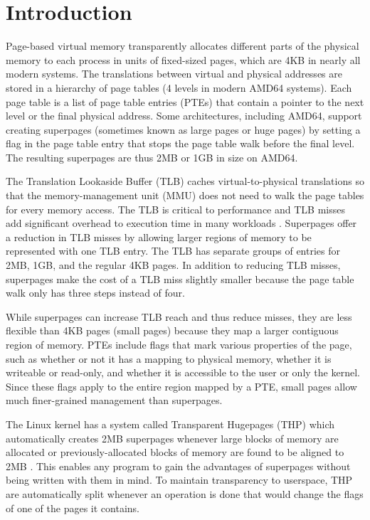 \chapter{Introduction}

Page-based virtual memory transparently allocates different parts of the physical memory to each process in units of fixed-sized pages, which are 4KB in nearly all modern systems. The translations between virtual and physical addresses are stored in a hierarchy of page tables (4 levels in modern AMD64 systems). Each page table is a list of page table entries (PTEs) that contain a pointer to the next level or the final physical address. Some architectures, including AMD64, support creating superpages (sometimes known as large pages or huge pages) by setting a flag in the page table entry that stops the page table walk before the final level. The resulting superpages are thus 2MB or 1GB in size on AMD64.

The Translation Lookaside Buffer (TLB) caches virtual-to-physical translations so that the memory-management unit (MMU) does not need to walk the page tables for every memory access. The TLB is critical to performance and TLB misses add significant overhead to execution time in many workloads \cite{Barr}. Superpages offer a reduction in TLB misses by allowing larger regions of memory to be represented with one TLB entry. The TLB has separate groups of entries for 2MB, 1GB, and the regular 4KB pages. In addition to reducing TLB misses, superpages make the cost of a TLB miss slightly smaller because the page table walk only has three steps instead of four.

While superpages can increase TLB reach and thus reduce misses, they are less flexible than 4KB pages (small pages) because they map a larger contiguous region of memory. PTEs include flags that mark various properties of the page, such as whether or not it has a mapping to physical memory, whether it is writeable or read-only, and whether it is accessible to the user or only the kernel. Since these flags apply to the entire region mapped by a PTE, small pages allow much finer-grained management than superpages.

The Linux kernel has a system called Transparent Hugepages (THP) which automatically creates 2MB superpages whenever large blocks of memory are allocated or previously-allocated blocks of memory are found to be aligned to 2MB \cite{THP}. This enables any program to gain the advantages of superpages without being written with them in mind. To maintain transparency to userspace, THP are automatically split whenever an operation is done that would change the flags of one of the pages it contains.

